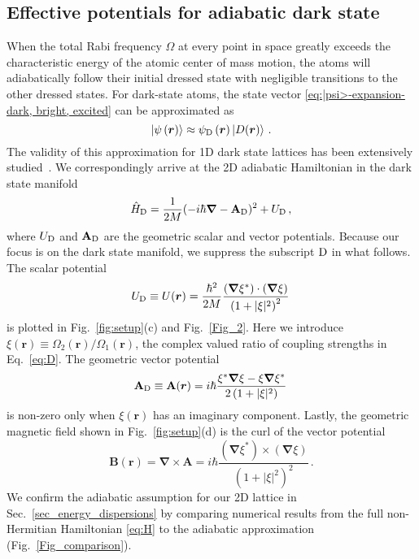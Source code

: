 \documentclass[aps,pra,twocolumn,showpacs,superscriptaddress,floatfix,longbibliography]{revtex4-1}
\def\Ud{U_{\rm D}}
\def\Udd{U}
\def\Ad{{\mathbf A}_{\rm D}}
\def\Add{{\mathbf A}}
\def\Bdd{{\mathbf B}}
\def\psid{\psi_{\rm D}}
\begin{document}
\subsection{Effective potentials for adiabatic dark state}
\label{sec_effective_adiabatic}

When the total Rabi frequency $\Omega$ at every point in space greatly exceeds the characteristic energy of the atomic center of mass motion, the atoms will adiabatically
follow their initial dressed state with negligible transitions to the other dressed states.
For dark-state atoms, the state vector \eqref{eq:|psi>-expansion-dark, bright, excited} can be approximated as 
%
\begin{equation}
|\psi\left(\boldsymbol{r}\right)\rangle\approx\psid\left(\boldsymbol{r}\right) \ket{D(\boldsymbol{r})}\,.
\label{eq:psi_D}
\end{equation}
%
The validity of this approximation for 1D dark state lattices has been extensively studied~\cite{Zoller2016, Zubairy2020, Jendrzejewski2016}.
We correspondingly arrive at the 2D adiabatic Hamiltonian in the dark state manifold \cite{Juzeliunas2005,Goldman2014} 
\begin{equation}
\hat{H}_{\rm D}=\frac{1}{2M}(-i\hbar\boldsymbol{\nabla}-\Ad)^{2}+\Ud\,,
\label{eq:Schroed_D}
\end{equation}
where $\Ud$ and $\Ad$ are the geometric
scalar and vector potentials.
Because our focus is on the dark state manifold, we suppress the subscript ${\rm D}$ in what follows.
The scalar potential
\begin{equation}
\Ud \equiv \Udd(\boldsymbol{r})=\frac{\hbar^{2}}{2M}\frac{(\boldsymbol{\nabla}\xi^{\ast})\cdot(\boldsymbol{\nabla}\xi)}{\left(1+|\xi|^{2}\right)^{2}} \,
\label{eq:U_D_general}
\end{equation}
is plotted in Fig.~\ref{fig:setup}(c) and Fig.~\ref{Fig_2}. Here we introduce $\xi(\boldsymbol{r}) \equiv \Omega_{2}(\boldsymbol{r}) / \Omega_{1}(\boldsymbol{r})$, the complex valued ratio of coupling strengths in Eq.~\eqref{eq:D}.
The geometric vector potential
\begin{equation}
\Ad \equiv \Add(\boldsymbol{r})=i\hbar\frac{\xi^{\ast}\boldsymbol{\nabla}\xi-\xi\boldsymbol{\nabla}\xi^{\ast}}{2\left(1+|\xi|^{2}\right)} \,
\label{eq:A_D_general}
\end{equation}
%
is non-zero only when $\xi(\boldsymbol{r})$ has an imaginary component.
Lastly, the geometric magnetic field shown in Fig.~\ref{fig:setup}(d) is the curl of the vector potential
\begin{equation}
\Bdd(\boldsymbol{r})=\boldsymbol{\nabla}\times\Add=i\hbar\frac{(\boldsymbol{\nabla}\xi^{\ast})\times(\boldsymbol{\nabla}\xi)}{\left(1+|\xi|^{2}\right)^{2}} \, .
\label{eq:B_D_general}
\end{equation}
%
We confirm the adiabatic assumption for our 2D lattice in Sec.~\ref{sec_energy_dispersions} by comparing numerical results from the full non-Hermitian Hamiltonian \eqref{eq:H} to the adiabatic approximation (Fig.~\ref{Fig_comparison}).
\end{document}
